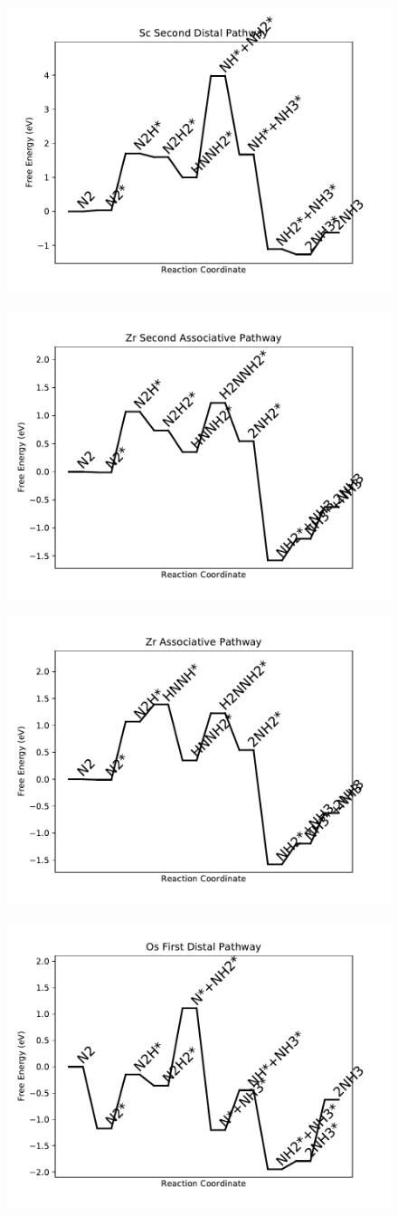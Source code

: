\documentclass[journal=jacsat,manuscript=article]{achemso}
\begin{document}
\begin{figure}
\includegraphics[width=0.5\linewidth]{data/plots/Sc_distal_2.pdf}
\label{fig:Sc_distal_2}
\end{figure}

\newpage
\begin{figure}
\includegraphics[width=0.5\linewidth]{data/plots/Zr_associative_2.pdf}
\label{fig:Zr_associative_2}
\end{figure}

\begin{figure}
\includegraphics[width=0.5\linewidth]{data/plots/Zr_associative.pdf}
\label{fig:Zr_associative}
\end{figure}

\newpage
\begin{figure}
\includegraphics[width=0.5\linewidth]{data/plots/Os_distal_1.pdf}
\label{fig:Os_distal_1}
\end{figure}
\end{document}
